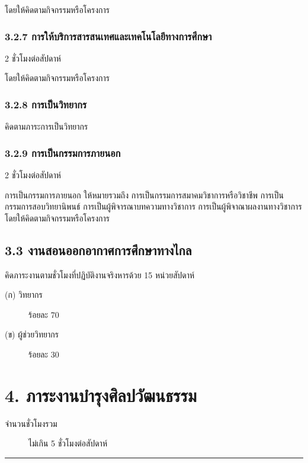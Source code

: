 \documentclass[a4paper,12pt,english]{sphinxmanual}
\begin{document}
โดยให้คิดตามกิจกรรมหรือโครงการ


\subsection{3.2.7  การให้บริการสารสนเทศและเทคโนโลยีทางการศึกษา}
\label{\detokenize{3service:id19}}
2 ชั่วโมงต่อสัปดาห์

โดยให้คิดตามกิจกรรมหรือโครงการ


\subsection{3.2.8  การเป็นวิทยากร}
\label{\detokenize{3service:id20}}
คิดตามภาระการเป็นวิทยากร


\subsection{3.2.9 การเป็นกรรมการภายนอก}
\label{\detokenize{3service:id21}}
2 ชั่วโมงต่อสัปดาห์

การเป็นกรรมการภายนอก ให้หมายรวมถึง การเป็นกรรมการสมาคมวิชาการหรือวิชาชีพ การเป็นกรรมการสอบวิทยานิพนธ์ การเป็นผู้พิจารณาบทความทางวิชาการ การเป็นผู้พิจาณาผลงานทางวิชาการ โดยให้คิดตามกิจกรรมหรือโครงการ


\section{3.3 งานสอนออกอากาศการศึกษาทางไกล}
\label{\detokenize{3service:id22}}
คิดภาระงานตามชั่วโมงที่ปฏิบัติงานจริงหารด้วย 15 หน่วยสัปดาห์
\begin{description}
\item[{(ก)  วิทยากร}] \leavevmode
ร้อยละ 70

\item[{(ข)  ผู้ช่วยวิทยากร}] \leavevmode
ร้อยละ 30

\end{description}


\chapter{4. ภาระงานบำรุงศิลปวัฒนธรรม}
\label{\detokenize{4culture:id1}}\label{\detokenize{4culture::doc}}\begin{description}
\item[{จำนวนชั่วโมงรวม}] \leavevmode
ไม่เกิน 5 ชั่วโมงต่อสัปดาห์

\end{description}


\bigskip\hrule\bigskip
\end{document}
